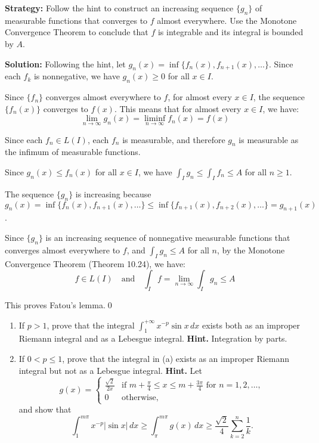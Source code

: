 \noindent\textbf{Strategy:} Follow the hint to construct an increasing sequence $\{g_n\}$ of measurable functions that converges to $f$ almost everywhere. Use the Monotone Convergence Theorem to conclude that $f$ is integrable and its integral is bounded by $A$.

\bigskip\noindent\textbf{Solution:}
Following the hint, let $g_n(x) = \inf \{f_n(x), f_{n+1}(x), \ldots\}$. Since each $f_k$ is nonnegative, we have $g_n(x) \geq 0$ for all $x \in I$.

Since $\{f_n\}$ converges almost everywhere to $f$, for almost every $x \in I$, the sequence $\{f_n(x)\}$ converges to $f(x)$. This means that for almost every $x \in I$, we have:
\[\lim_{n \to \infty} g_n(x) = \liminf_{n \to \infty} f_n(x) = f(x)\]

Since each $f_n \in L(I)$, each $f_n$ is measurable, and therefore $g_n$ is measurable as the infimum of measurable functions.

Since $g_n(x) \leq f_n(x)$ for all $x \in I$, we have $\int_I g_n \leq \int_I f_n \leq A$ for all $n \geq 1$.

The sequence $\{g_n\}$ is increasing because $g_n(x) = \inf \{f_n(x), f_{n+1}(x), \ldots\} \leq \inf \{f_{n+1}(x), f_{n+2}(x), \ldots\} = g_{n+1}(x)$.

Since $\{g_n\}$ is an increasing sequence of nonnegative measurable functions that converges almost everywhere to $f$, and $\int_I g_n \leq A$ for all $n$, by the Monotone Convergence Theorem (Theorem 10.24), we have:
\[f \in L(I) \quad \text{and} \quad \int_I f = \lim_{n \to \infty} \int_I g_n \leq A\]

This proves Fatou's lemma.\qed


\begin{problembox}
\begin{problemstatement}
\begin{enumerate}[label=(\alph*)]
\item If $p > 1$, prove that the integral $\int_1^{+\infty} x^{-p} \sin x \, dx$ exists both as an improper Riemann integral and as a Lebesgue integral. \textbf{Hint.} Integration by parts.
\item If $0 < p \leq 1$, prove that the integral in (a) exists as an improper Riemann integral but not as a Lebesgue integral. \textbf{Hint.} Let
\[g(x) = 
\begin{cases} 
\frac{\sqrt{2}}{2x} & \text{if } m + \frac{\pi}{4} \leq x \leq m + \frac{3\pi}{4} \text{ for } n = 1, 2, \ldots, \\ 
0 & \text{otherwise},
\end{cases}\]
and show that
\[\int_{1}^{m\pi} x^{-p} |\sin x| \, dx \geq \int_{\pi}^{m\pi} g(x) \, dx \geq \frac{\sqrt{2}}{4} \sum_{k=2}^{n} \frac{1}{k}.\]
\end{enumerate}
\end{problemstatement}
\end{problembox}

